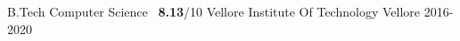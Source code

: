 \begin{cventries}
  \cventry
    { B.Tech Computer Science \textbar\ \textbf{8.13}{/10} }
    { Vellore Institute Of Technology }
    { Vellore }
    { 2016-2020 }
    {}
\end{cventries}
